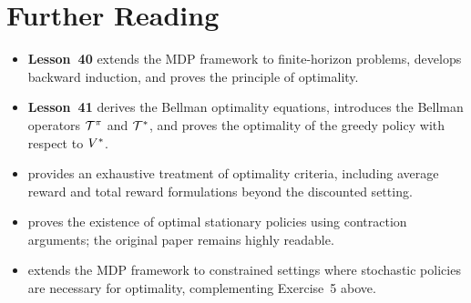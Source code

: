 \documentclass[11pt,a4paper]{article}
\begin{document}

\section{Further Reading}
\label{sec:further-reading}

\begin{itemize}
    \item \textbf{Lesson~40} extends the MDP framework to
    finite-horizon problems, develops backward induction, and proves
    the principle of optimality.
    \item \textbf{Lesson~41} derives the Bellman optimality equations,
    introduces the Bellman operators $\mathcal{T}^\pi$ and
    $\mathcal{T}^*$, and proves the optimality of the greedy policy with
    respect to $V^*$.
    \item \citet[Chapters 4--6]{puterman2014} provides an exhaustive
    treatment of optimality criteria, including average reward and
    total reward formulations beyond the discounted setting.
    \item \citet{blackwell1962} proves the existence of optimal
    stationary policies using contraction arguments; the original
    paper remains highly readable.
    \item \citet{altman1999} extends the MDP framework to constrained
    settings where stochastic policies are necessary for optimality,
    complementing Exercise~5 above.
\end{itemize}


\end{document}
